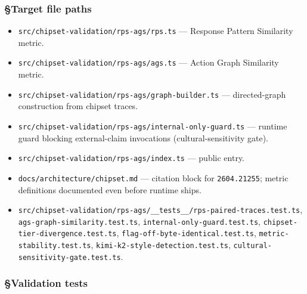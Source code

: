 \documentclass[11pt,letterpaper]{article}
\newcommand{\arxivid}[1]{\texttt{\textcolor{accent}{#1}}}
\providecommand{\tightlist}{\setlength{\itemsep}{0pt}\setlength{\parskip}{0pt}}
\begin{document}
\subsubsection{§Target file paths}

\begin{itemize}
\tightlist
\item
  \texttt{src/chipset-validation/rps-ags/rps.ts} --- Response Pattern
  Similarity metric.
\item
  \texttt{src/chipset-validation/rps-ags/ags.ts} --- Action Graph
  Similarity metric.
\item
  \texttt{src/chipset-validation/rps-ags/graph-builder.ts} ---
  directed-graph construction from chipset traces.
\item
  \texttt{src/chipset-validation/rps-ags/internal-only-guard.ts} ---
  runtime guard blocking external-claim invocations
  (cultural-sensitivity gate).
\item
  \texttt{src/chipset-validation/rps-ags/index.ts} --- public entry.
\item
  \texttt{docs/architecture/chipset.md} --- citation block for
  \arxivid{2604.21255}; metric definitions documented even before runtime
  ships.
\item
  \texttt{src/chipset-validation/rps-ags/\_\_tests\_\_/rps-paired-traces.test.ts},
  \texttt{ags-graph-similarity.test.ts},
  \texttt{internal-only-guard.test.ts},
  \texttt{chipset-tier-divergence.test.ts},
  \texttt{flag-off-byte-identical.test.ts},
  \texttt{metric-stability.test.ts},
  \texttt{kimi-k2-style-detection.test.ts},
  \texttt{cultural-sensitivity-gate.test.ts}.
\end{itemize}

\subsubsection{§Validation tests}
\end{document}
